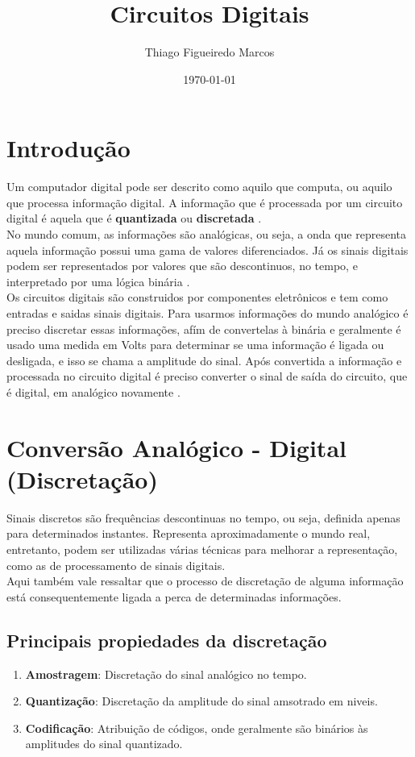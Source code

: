 \documentclass[12pt, onecolumn]{article}
\title{Circuitos Digitais}
\author{Thiago Figueiredo Marcos}
\date{\today}
\begin{document}
	
	\maketitle

	\section{\centering Introdução}
	
	Um computador digital pode ser descrito como aquilo que computa, ou aquilo 
	que processa informação digital. A informação que é processada por 
	um circuito digital é aquela que é \textbf{quantizada} ou 
	\textbf{discretada} \citep{art1}. \\
	\newline
	No mundo comum, as informações são analógicas, ou seja, a onda que 
	representa aquela informação possui uma gama de valores diferenciados. 
	Já os sinais digitais podem ser representados por valores que são descontinuos, 
	no tempo, e interpretado por uma lógica binária \citep{bk1}. \\ 
	\newline
	Os circuitos digitais são construidos por componentes eletrônicos e 
	tem como entradas e saidas sinais digitais. Para usarmos informações 
	do mundo analógico é preciso discretar essas informações, afím de 
	convertelas à binária e geralmente é usado uma medida em Volts para 
	determinar se uma informação é ligada ou desligada, e isso se chama a
	amplitude do sinal. 
	Após convertida a informação e processada no circuito digital é 
	preciso converter o sinal de saída do circuito, que é digital, 
	em analógico novamente \citep{art2}.

	\section{\centering Conversão Analógico - Digital (Discretação)}
	
	Sinais discretos são frequências descontinuas no tempo, ou seja, 
	definida apenas para determinados instantes. Representa aproximadamente 
	o mundo real, entretanto, podem ser utilizadas várias técnicas para 
	melhorar a representação, como as de processamento de sinais digitais.\\
	\newline
	Aqui também vale ressaltar que o processo de discretação de alguma 
	informação está consequentemente ligada a perca de determinadas 
	informações.
		
	\subsection{\centering Principais propiedades da discretação}	
	\begin{enumerate}
		\item\textbf{Amostragem}: Discretação do sinal analógico no tempo.
		\item\textbf{Quantização}: Discretação da amplitude 
			do sinal amsotrado em niveis.
		\item\textbf{Codificação}: Atribuição de códigos, onde geralmente 
				são binários às	amplitudes do sinal quantizado.
	\end{enumerate}
\end{document}
